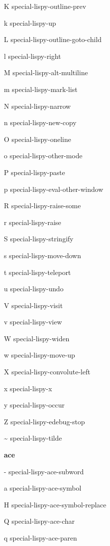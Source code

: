 \documentclass[a4paper,10pt]{article}
\renewcommand\section[1]{\bigskip\par\textbf{\large#1}\medskip}
\newcommand\keyify[1]{\keys{\ttfamily#1}}
\begin{document}
\begin{multicols*}{3}
\begin{keylist}[labelwidth=\widthof{\keyify{RET}}]
	\item[K] special-lispy-outline-prev
	\item[k] special-lispy-up
	\item[L] special-lispy-outline-goto-child
	\item[l] special-lispy-right
	\item[M] special-lispy-alt-multiline
	\item[m] special-lispy-mark-list
	\item[N] special-lispy-narrow
	\item[n] special-lispy-new-copy
	\item[O] special-lispy-oneline
	\item[o] special-lispy-other-mode
	\item[P] special-lispy-paste
	\item[p] special-lispy-eval-other-window
	\item[R] special-lispy-raise-some
	\item[r] special-lispy-raise
	\item[S] special-lispy-stringify
	\item[s] special-lispy-move-down
	\item[t] special-lispy-teleport
	\item[u] special-lispy-undo
	\item[V] special-lispy-visit
	\item[v] special-lispy-view
	\item[W] special-lispy-widen
	\item[w] special-lispy-move-up
	\item[X] special-lispy-convolute-left
	\item[x] special-lispy-x
	\item[y] special-lispy-occur
	\item[Z] special-lispy-edebug-stop
	\item[\textasciitilde] special-lispy-tilde
\end{keylist}


\section{ace}
\begin{keylist}[labelwidth=\widthof{\keyify{-}}]
	\item[-] special-lispy-ace-subword
	\item[a] special-lispy-ace-symbol
	\item[H] special-lispy-ace-symbol-replace
	\item[Q] special-lispy-ace-char
	\item[q] special-lispy-ace-paren
\end{keylist}




\end{multicols*}
\end{document}
